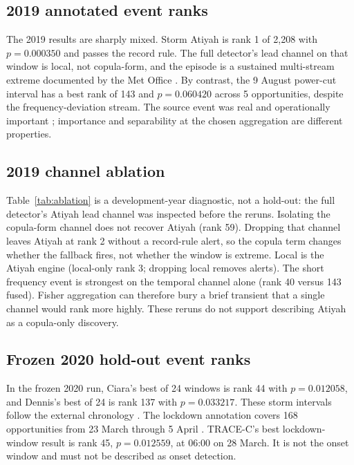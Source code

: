 \subsection{2019 annotated event ranks}

The 2019 results are sharply mixed. Storm Atiyah is rank 1 of 2,208 with
$p=0.000350$ and passes the record rule. The full detector's lead channel on
that window is local, not copula-form, and the episode is a sustained
multi-stream extreme documented by the Met Office
\citep{metoffice2020stormseason}. By contrast, the 9 August power-cut interval
has a best rank of 143 and $p=0.060420$ across 5 opportunities, despite the
frequency-deviation stream. The source event was real and operationally
important \citep{ofgem2020poweroutage}; importance and separability at the
chosen aggregation are different properties.

\subsection{2019 channel ablation}



Table~\ref{tab:ablation} is a development-year diagnostic, not a hold-out: the
full detector's Atiyah lead channel was inspected before the reruns. Isolating
the copula-form channel does not recover Atiyah (rank 59). Dropping that
channel leaves Atiyah at rank 2 without a record-rule alert, so the copula term
changes whether the fallback fires, not whether the window is extreme. Local
is the Atiyah engine (local-only rank 3; dropping local removes alerts). The
short frequency event is strongest on the temporal channel alone (rank 40
versus 143 fused). Fisher aggregation can therefore bury a brief transient
that a single channel would rank more highly. These reruns do not support
describing Atiyah as a copula-only discovery.

\subsection{Frozen 2020 hold-out event ranks}

In the frozen 2020 run, Ciara's best of 24 windows is rank 44 with
$p=0.012058$, and Dennis's best of 24 is rank 137 with $p=0.033217$. These storm
intervals follow the external chronology \citep{metoffice2020stormseason}. The
lockdown annotation covers 168 opportunities from 23 March through 5 April
\citep{ukgov2020lockdown}. TRACE-C's best lockdown-window result is rank 45,
$p=0.012559$, at 06:00 on 28 March. It is not the onset window and must not be
described as onset detection.

